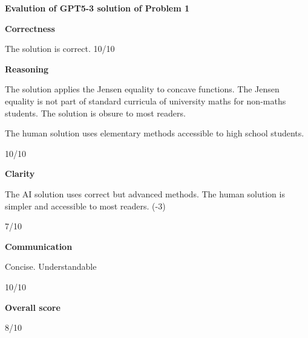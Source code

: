 \documentclass{article}
\begin{document}
{\bf Evalution of GPT5-3 solution of Problem 1}

{\bf Correctness}

The solution is correct. 10/10

{\bf Reasoning}

The solution applies the Jensen equality to concave functions. The Jensen equality is not part of standard curricula of university maths for non-maths students. The solution is obsure to most readers.

The human solution uses elementary methods accessible to high school students. 

10/10

{\bf Clarity}

The AI solution uses correct but advanced methods. The human solution is simpler and accessible to most readers. (-3) 

7/10

{\bf Communication}

Concise. Understandable

10/10

{\bf Overall score}

8/10
\end{document}

